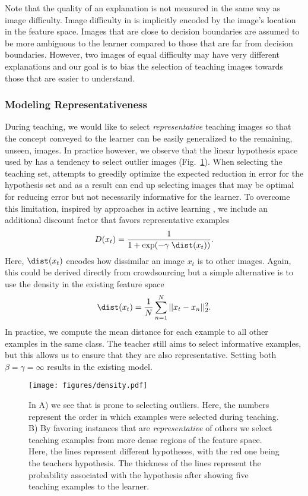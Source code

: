 \documentclass[../main.tex]{subfiles}
\begin{document}
Note that the quality of an explanation is not measured in the same way as image difficulty.
Image difficulty in \STRICT is implicitly encoded by the image's location in the feature space. 
Images that are close to decision boundaries are assumed to be more ambiguous to the learner compared to those that are far from decision boundaries.
However, two images of equal difficulty may have very different explanations and our goal is to bias the selection of teaching images towards those that are easier to understand. 


\subsubsection*{Modeling Representativeness}
During teaching, we would like to select \emph{representative} teaching images so that the concept conveyed to the learner can be easily generalized to the remaining, unseen, images. %
In practice however, we observe that the linear hypothesis space used by \STRICT has a tendency to select outlier images (Fig.~\ref{fig:density}). 
When selecting the teaching set, \STRICT attempts to greedily optimize the expected reduction in error for the hypothesis set and as a result can end up selecting images that may be optimal for reducing error but not necessarily informative for the learner. 
To overcome this limitation, inspired by approaches in active learning \cite{settles2012active}, we include an additional discount factor that favors representative examples
\begin{equation}
   D(x_t) = \frac{1}{1 + \exp(-\gamma\; \dist(x_t))}.
\end{equation}
Here, $\dist(x_t)$ encodes how dissimilar an image $x_t$ is to other images. Again, this could be derived directly from crowdsourcing but a simple alternative is to use the density in the existing feature space
\begin{equation}
   \dist(x_t) = \frac{1}{N}\sum_{n=1}^{N}{||x_t -x_n||_2^2}.
\end{equation}
In practice, we compute the mean distance for each example to all other examples in the same class.
The teacher still aims to select informative examples, but this allows us to ensure that they are also representative.
Setting both $\beta  = \gamma = \infty$ results in the existing \STRICT model. 

\begin{figure}[t]
\centering
\texttt{[image: figures/density.pdf]}
\caption{In A) we see that \STRICT is prone to selecting outliers. Here, the numbers represent the order in which examples were selected during teaching. B) By favoring instances that are \emph{representative} of others  we select teaching examples from more dense regions of the feature space. Here, the lines represent different hypotheses, with the red one being the teachers hypothesis. The thickness of the lines represent the probability associated with the hypothesis after showing five teaching examples to the learner.} 
\label{fig:density}
\end{figure}
\end{document}
